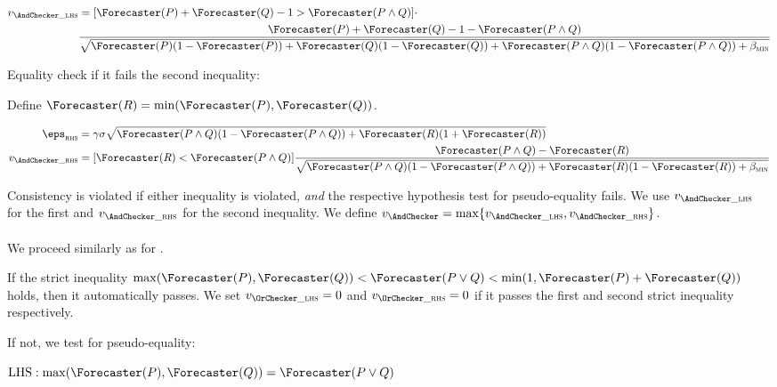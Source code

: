\begin{align*}
    v_{\AndChecker\_\textsc{lhs}}
    &= [\Forecaster(P) + \Forecaster(Q) - 1 > \Forecaster(P\land Q)] \cdot \\ &\frac{
            \Forecaster(P) + \Forecaster(Q) - 1 - \Forecaster(P \land Q)
    }{
        \sqrt{\Forecaster(P)(1-\Forecaster(P))+\Forecaster(Q)(1-\Forecaster(Q)) + \Forecaster(P\land Q)(1-\Forecaster(P\land Q))+ \betamin}
    }
\end{align*}

Equality check if it fails the second inequality:

Define $\Forecaster(R) =  \min(\Forecaster(P),\Forecaster(Q))$.

\begin{align*}
    \eps_{\textsc{rhs}}
    &=  \gamma\sigma\sqrt{
        \Forecaster(P\land Q)(1-\Forecaster(P\land Q))+\Forecaster(R)(1+\Forecaster(R))
    }
    \\
    v_{\AndChecker\_{\textsc{rhs}}}
    &= [\Forecaster(R) < \Forecaster(P\land Q)] \frac{
            \Forecaster(P \land Q) - \Forecaster(R)
    }{
        \sqrt{\Forecaster(P\land Q)(1-\Forecaster(P\land Q)) + \Forecaster(R)(1-\Forecaster(R))+ \betamin}
    }
\end{align*}


Consistency is violated if either inequality is violated, \emph{and} the respective hypothesis test for pseudo-equality fails. We use $v_{\AndChecker\_\textsc{lhs}}$ for the first and $v_{\AndChecker\_\textsc{rhs}}$ for the second inequality.
We define $v_{\AndChecker} = \max\{v_{\AndChecker\_\textsc{lhs}}, v_{\AndChecker\_\textsc{rhs}} \}$.



\paragraph{\OrChecker}

We proceed similarly as for \AndChecker{}.

If the strict inequality $\max(\Forecaster(P),\Forecaster(Q))<\Forecaster(P\lor Q)<\min(1,\Forecaster(P)+\Forecaster(Q))$ holds, then it automatically passes.  We set $v_{\OrChecker\_\textsc{lhs}} = 0$ and $v_{\OrChecker\_\textsc{rhs}} = 0$ if it passes the first and second strict inequality respectively.

If not, we test for pseudo-equality:

$\text{LHS}: \max(\Forecaster(P),\Forecaster(Q)) = \Forecaster(P\lor Q)$

